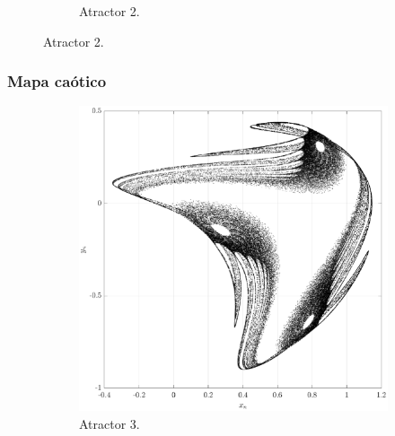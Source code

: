 \documentclass[10pt]{beamer}
\begin{document}
\begin{frame}
\begin{figure}[hbtp]
\begin{subfigure}[b]{0.475\textwidth}
                \caption{Atractor 2.}    
                \label{fig:mapa_2}
            \end{subfigure}
        \end{figure}
\end{frame}


\begin{frame}
    \frametitle{Mapa caótico}
	\begin{figure}[hbtp]
            \centering
            \caption{Diferentes atractores caóticos del mapa bidimensional $A_{3}$ y $A_{4}$.} 
            \begin{subfigure}[b]{0.475\textwidth}   
                \centering 
                \includegraphics[width=\textwidth,trim=70 0 70 0,clip]{G3_map3}
                \caption{Atractor 3.}    
                \label{fig:mapa_3}
            \end{subfigure}
            \hfill
            \begin{subfigure}[b]{0.475\textwidth}   
                \centering 

\end{subfigure}
\end{figure}
\end{frame}
\end{document}
